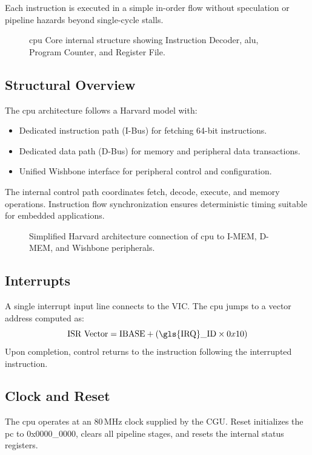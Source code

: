 Each instruction is executed in a simple in-order flow without speculation or
\gls{pipeline} hazards beyond single-cycle stalls.

\begin{figure}[H]
    \centering
    \caption{\gls{cpu} Core internal structure showing Instruction Decoder, \gls{alu}, Program Counter, and Register File.}
    \label{fig:cpu_structure}
\end{figure}

\subsection{Structural Overview}
The \gls{cpu} architecture follows a \gls{Harvard} model with:
\begin{itemize}
    \item Dedicated instruction path (I-Bus) for fetching 64-bit instructions.
    \item Dedicated data path (D-Bus) for memory and peripheral data transactions.
    \item Unified Wishbone interface for peripheral control and configuration.
\end{itemize}

The internal control path coordinates fetch, decode, execute, and memory
operations. Instruction flow synchronization ensures deterministic timing
suitable for embedded applications.

\begin{figure}[H]
    \centering
    \caption{Simplified \gls{Harvard} architecture connection of \gls{cpu} to \gls{I-MEM}, \gls{D-MEM}, and Wishbone peripherals.}
    \label{fig:cpu_harvard_arch}
\end{figure}

\subsection{Interrupts}
A single interrupt input line connects to the VIC. The \gls{cpu} jumps to a
vector address computed as:
\[
    \text{ISR Vector} = \text{IBASE} + (\text{\gls{IRQ}\_ID} \times 0x10)
\]
Upon completion, control returns to the instruction following the interrupted
instruction.

\subsection{Clock and Reset}
The \gls{cpu} operates at an 80\,MHz clock supplied by the CGU. Reset
initializes the \gls{pc} to 0x0000\_0000, clears all \gls{pipeline} stages, and
resets the internal status registers.

